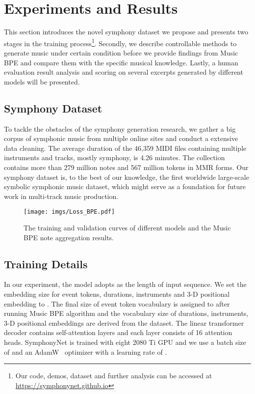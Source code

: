 \documentclass{article}
\begin{document}
\section{Experiments and Results} \label{Result}
This section introduces the novel symphony dataset we propose and presents two stages in the training process\footnote{Our code, demos, dataset and further analysis can be accessed at \href{https://symphonynet.github.io}{https://symphonynet.github.io}}. Secondly, we describe controllable methods to generate music under certain condition before  we provide findings from Music BPE and compare them with the specific musical knowledge. Lastly, a human evaluation result analysis and scoring on several excerpts generated by different models will be presented.

\subsection{Symphony Dataset}
To tackle the obstacles of the symphony generation research, we gather a big corpus of symphonic music from multiple online sites and conduct a extensive data cleaning. The average duration of the 46,359 MIDI files containing multiple instruments and tracks, mostly symphony, is 4.26 minutes. The collection contains more than 279 million notes and 567 million tokens in MMR forms. Our symphony dataset is, to the best of our knowledge, the first worldwide large-scale symbolic symphonic music dataset, which might serve as a foundation for future work in multi-track music production.


\begin{figure}[t]
  \centering
  \centerline{\texttt{[image: imgs/Loss\_BPE.pdf]}}
  \caption{The training and validation curves of different models and the Music BPE note aggregation results.}
  \label{fig:loss}
\end{figure}

\subsection{Training Details}
In our experiment, the model adopts  as the length of input sequence. We set the embedding size for event tokens, durations, instruments and 3-D positional embedding to . The final size of event token vocabulary is assigned to  after running Music BPE algorithm and the vocabulary size of durations, instruments, 3-D positional embeddings are derived from the dataset. The linear transformer decoder contains  self-attention layers and each layer consists of 16 attention heads. SymphonyNet is trained with eight 2080 Ti GPU and we use a batch size of  and an AdamW~\cite{adamw} optimizer with a learning rate of . 
\end{document}
